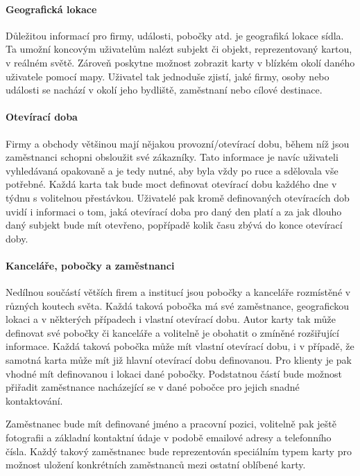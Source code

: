 	\paragraph{Geografická lokace}

	Důležitou informací pro firmy, události, pobočky atd. je geografiká lokace sídla.
	Ta umožní koncovým uživatelům nalézt subjekt či objekt, reprezentovaný kartou, v reálném světě.
	Zároveň poskytne možnost zobrazit karty v blízkém okolí daného uživatele pomocí mapy.
	Uživatel tak jednoduše zjistí, jaké firmy, osoby nebo události se nachází v okolí jeho bydliště, zaměstnaní nebo
	cílové destinace.

	\paragraph{Otevírací doba}

	Firmy a obchody většinou mají nějakou provozní/otevírací dobu, během níž jsou zaměstnanci schopni obsloužit své zákazníky.
	Tato informace je navíc uživateli vyhledávaná opakovaně a je tedy nutné, aby byla vždy po ruce a sdělovala vše potřebné.
	Každá karta tak bude moct definovat otevírací dobu každého dne v týdnu s volitelnou přestávkou.
	Uživatelé pak kromě definovaných otevíracích dob uvidí i informaci o tom, jaká otevírací doba pro daný den platí
	a za jak dlouho daný subjekt bude mít otevřeno, popřípadě kolik času zbývá do konce otevírací doby.

	\paragraph{Kanceláře, pobočky a zaměstnanci}

	Nedílnou součástí větších firem a institucí jsou pobočky a kanceláře rozmístěné v různých koutech světa.
	Každá taková pobočka má své zaměstnance, geografickou lokaci a v některých případech i vlastní otevírací dobu.
	Autor karty tak může definovat své pobočky či kanceláře a volitelně je obohatit o zmíněné rozšiřující informace.
	Každá taková pobočka může mít vlastní otevírací dobu, i v případě, že samotná karta může mít již hlavní otevírací dobu
	definovanou.
	Pro klienty je pak vhodné mít definovanou i lokaci dané pobočky.
	Podstatnou částí bude možnost přiřadit zaměstnance nacházející se v dané pobočce pro jejich snadné kontaktování.

	Zaměstnanec bude mít definované jméno a pracovní pozici, volitelně pak ještě fotografii a základní kontaktní údaje
	v podobě emailové adresy a telefonního čísla.
	Každý takový zaměstnanec bude reprezentován speciálním typem karty pro možnost uložení konkrétních zaměstnanců mezi
	ostatní oblíbené karty.

